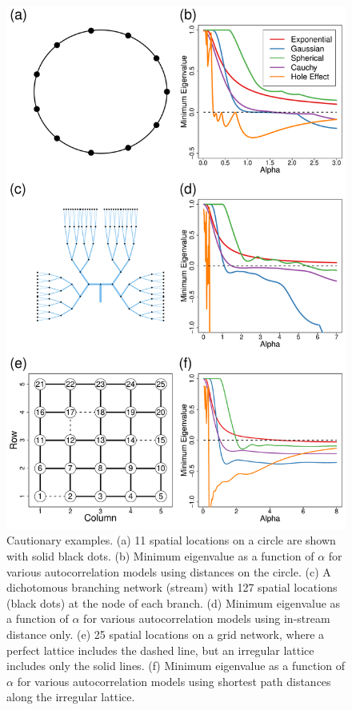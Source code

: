 \documentclass[11pt, titlepage]{article}\usepackage[]{graphicx}\usepackage[]{color}
\begin{document}
\begin{spacing}{1.9}
\begin{flushleft}
\begin{singlespace}


	\begin{figure}[H]
	  \begin{center}
	    \includegraphics[width=.7\linewidth]{figure/Fig-CautionEx-1.pdf}
	  \end{center}
	  \caption{Cautionary examples. (a) 11 spatial locations on a circle are shown with solid black dots. (b) Minimum eigenvalue as a function of $\alpha$ for various autocorrelation models using distances on the circle. (c) A dichotomous branching network (stream) with 127 spatial locations (black dots) at the node of each branch. (d) Minimum eigenvalue as a function of $\alpha$ for various autocorrelation models using in-stream distance only. (e) 25 spatial locations on a grid network, where a perfect lattice includes the dashed line, but an irregular lattice includes only the solid lines. (f) Minimum eigenvalue as a function of $\alpha$  for various autocorrelation models using shortest path distances along the irregular lattice. \label{fig:cautionEx}}
  \end{figure}



\end{singlespace}
\end{flushleft}
\end{spacing}
\end{document}
